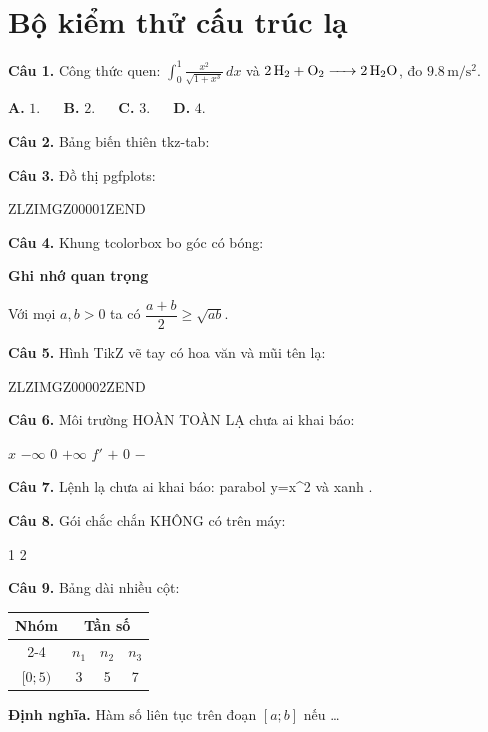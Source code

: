 \documentclass[12pt,a4paper]{article}
\begin{document}
\section*{Bộ kiểm thử cấu trúc lạ}

\textbf{Câu 1.} Công thức quen: $\displaystyle\int_0^1 \frac{x^2}{\sqrt{1+x^3}}\,dx$ và $\ce{2H2 + O2 -> 2H2O}$, đo $9.8\,\mathrm{m}/\mathrm{s}^2$.
\par\noindent\textbf{A.} $1$.   \textbf{B.} $2$.   \textbf{C.} $3$.   \textbf{D.} $4$.\par

\textbf{Câu 2.} Bảng biến thiên tkz-tab:
\begin{center}
\end{center}

\textbf{Câu 3.} Đồ thị pgfplots:
\begin{center}


ZLZIMGZ00001ZEND


\end{center}

\textbf{Câu 4.} Khung tcolorbox bo góc có bóng:


\textbf{Ghi nhớ quan trọng}


Với mọi $a,b>0$ ta có $\dfrac{a+b}{2}\ge\sqrt{ab}$.




\textbf{Câu 5.} Hình TikZ vẽ tay có hoa văn và mũi tên lạ:
\begin{center}


ZLZIMGZ00002ZEND


\end{center}

\textbf{Câu 6.} Môi trường HOÀN TOÀN LẠ chưa ai khai báo:



 $x$ $-\infty$ $0$ $+\infty$ 
 $f'$ $+$ $0$ $-$ 




\textbf{Câu 7.} Lệnh lạ chưa ai khai báo:  parabol y=x^2  và  xanh .

\textbf{Câu 8.} Gói chắc chắn KHÔNG có trên máy:
\begin{center}



 1 2 



\end{center}

\textbf{Câu 9.} Bảng dài nhiều cột:
\begin{center}
\begin{tabular}{|c|c|c|c|}
\hline
\multirow{2}{*}{Nhóm} & \multicolumn{3}{c|}{Tần số} \\ \cline{2-4}
 & $n_1$ & $n_2$ & $n_3$ \\ \hline
$[0;5)$ & 3 & 5 & 7 \\ \hline
\end{tabular}
\end{center}

\textbf{Định nghĩa.} Hàm số liên tục trên đoạn $[a;b]$ nếu \ldots
\end{document}
